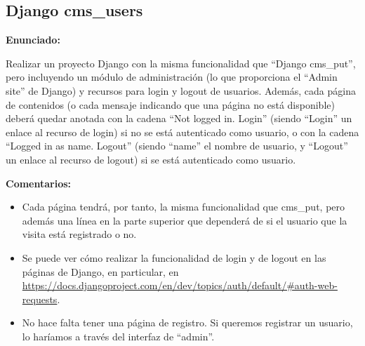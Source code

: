 \subsection{Django cms\_users}
\label{subsec:django-users}

\textbf{Enunciado:}

Realizar un proyecto Django con la misma funcionalidad que ``Django cms\_put'', pero incluyendo un módulo de administración (lo que proporciona el ``Admin site'' de Django) y recursos para login y logout de usuarios. Además, cada página de contenidos (o cada mensaje indicando que una página no está disponible) deberá quedar anotada con la cadena ``Not logged in. Login'' (siendo ``Login'' un enlace al recurso de login) si no se está autenticado como usuario, o con la cadena ``Logged in as name. Logout'' (siendo ``name'' el nombre de usuario, y ``Logout'' un enlace al recurso de logout) si se está autenticado como usuario.

\textbf{Comentarios:}

\begin{itemize}
  \item Cada página tendrá, por tanto, la misma funcionalidad que cms\_put, pero además una línea en la parte superior que dependerá de si el usuario que la visita está registrado o no.

  \item Se puede ver cómo realizar la funcionalidad de login y de logout en las páginas de Django, en particular, en \url{https://docs.djangoproject.com/en/dev/topics/auth/default/#auth-web-requests}.

  \item No hace falta tener una página de registro. Si queremos registrar un usuario, lo haríamos a través del interfaz de ``admin''.
\end{itemize}





